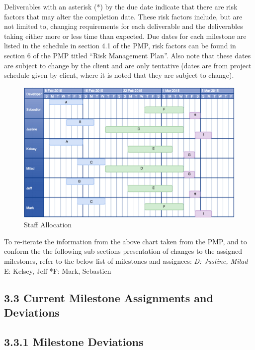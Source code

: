 \documentclass[]{article}
\begin{document}
Deliverables with an asterisk (*) by the due date indicate that there
are risk factors that may alter the completion date. These risk factors
include, but are not limited to, changing requirements for each
deliverable and the deliverables taking either more or less time than
expected. Due dates for each milestone are listed in the schedule in
section 4.1 of the PMP, risk factors can be found in section 6 of the
PMP titled ``Risk Management Plan''. Also note that these dates are
subject to change by the client and are only tentative (dates are from
project schedule given by client, where it is noted that they are
subject to change).

\begin{figure}[htbp]
\centering
\includegraphics{StaffAllocation.png}
\caption{Staff Allocation}
\end{figure}

To re-iterate the information from the above chart taken from the PMP,
and to conform the the following sub sections presentation of changes to
the assigned milestones, refer to the below list of milestones and
assignees: \emph{D: Justine, Milad }E: Kelsey, Jeff *F: Mark, Sebastien

\subsection{\textbf{3.3 Current Milestone Assignments and
Deviations}}\label{current-milestone-assignments-and-deviations}

\subsection{\textbf{3.3.1 Milestone
Deviations}}\label{milestone-deviations}
\end{document}
